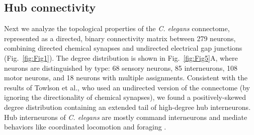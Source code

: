\documentclass[10pt,letterpaper]{article}
\begin{document}


\subsection*{Hub connectivity}


Next we analyze the topological properties of the \emph{C. elegans} connectome, represented as a directed, binary connectivity matrix between 279 neurons, combining directed chemical synapses and undirected electrical gap junctions (Fig.~\ref{fig:Fig1}).
The degree distribution is shown in Fig.~\ref{fig:Fig5}A, where neurons are distinguished by type: 68 sensory neurons, 85 interneurons, 108 motor neurons, and 18 neurons with multiple assignments.
Consistent with the results of Towlson et al., who used an undirected version of the connectome (by ignoring the directionality of chemical synapses), we found a positively-skewed degree distribution containing an extended tail of high-degree hub interneurons.
Hub interneurons of \emph{C. elegans} are mostly command interneurons and mediate behaviors like coordinated locomotion and foraging \cite{tsalik2003}.
\end{document}
